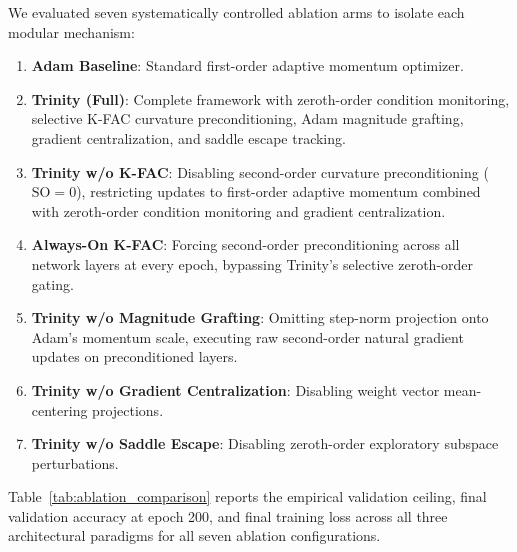 \documentclass[conference]{IEEEtran}
\begin{document}
We evaluated seven systematically controlled ablation arms to isolate each modular mechanism:
\begin{enumerate}
    \item \textbf{Adam Baseline}: Standard first-order adaptive momentum optimizer.
    \item \textbf{Trinity (Full)}: Complete framework with zeroth-order condition monitoring, selective K-FAC curvature preconditioning, Adam magnitude grafting, gradient centralization, and saddle escape tracking.
    \item \textbf{Trinity w/o K-FAC}: Disabling second-order curvature preconditioning ($\text{SO}=0$), restricting updates to first-order adaptive momentum combined with zeroth-order condition monitoring and gradient centralization.
    \item \textbf{Always-On K-FAC}: Forcing second-order preconditioning across all network layers at every epoch, bypassing Trinity's selective zeroth-order gating.
    \item \textbf{Trinity w/o Magnitude Grafting}: Omitting step-norm projection onto Adam's momentum scale, executing raw second-order natural gradient updates on preconditioned layers.
    \item \textbf{Trinity w/o Gradient Centralization}: Disabling weight vector mean-centering projections.
    \item \textbf{Trinity w/o Saddle Escape}: Disabling zeroth-order exploratory subspace perturbations.
\end{enumerate}

Table~\ref{tab:ablation_comparison} reports the empirical validation ceiling, final validation accuracy at epoch 200, and final training loss across all three architectural paradigms for all seven ablation configurations.
\end{document}
